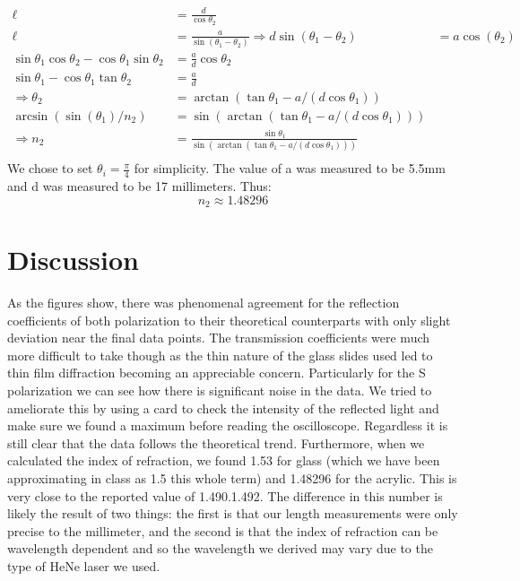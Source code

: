 \documentclass[letter, 11pt, onecolumn]{article}
\begin{document}
	\begin{align*}
		\ell &= \frac{d}{\cos\theta_2} \\ 
		\ell &= \frac{a}{\sin(\theta_1-\theta_2)}
		\Rightarrow d\sin(\theta_1-\theta_2) &= a\cos(\theta_2) \\ 
		\sin\theta_1\cos\theta_2-\cos\theta_1\sin\theta_2 &= \frac{a}{d}\cos\theta_2\\ 
		\sin\theta_1-\cos\theta_1\tan\theta_2 &= \frac{a}{d} \\ 
		\Rightarrow \theta_2 &= \arctan(\tan\theta_1-a/(d\cos\theta_1)) \\ 
		\arcsin(\sin(\theta_1)/n_2) &= \sin(\arctan(\tan\theta_1-a/(d\cos\theta_1))) \\ 
		\Rightarrow n_2 &= \frac{\sin\theta_1}{\sin(\arctan(\tan\theta_1-a/(d\cos\theta_1)))} \\ 
	\end{align*}
We chose to set $\theta_i = \frac{\pi}{4}$ for simplicity. The value of a was measured to be 5.5mm and d was measured to be 17 millimeters. Thus: 
	\begin{equation}
		n_2 \approx 1.48296 
	\end{equation}

\section*{Discussion} 
As the figures show, there was phenomenal agreement for the reflection coefficients of both polarization to their theoretical counterparts with only slight deviation near the final data points. The transmission coefficients were much more difficult to take though as the thin nature of the glass slides used led to thin film diffraction becoming an appreciable concern. Particularly for the S polarization we can see how there is significant noise in the data. We tried to ameliorate this by using a card to check the intensity of the reflected light and make sure we found a maximum before reading the oscilloscope. Regardless it is still clear that the data follows the theoretical trend. Furthermore, when we calculated the index of refraction, we found 1.53 for glass (which we have been approximating in class as 1.5 this whole term) and 1.48296 for the acrylic. This is very close to the reported value of 1.490.1.492. The difference in this number is likely the result of two things: the first is that our length measurements were only precise to the millimeter, and the second is that the index of refraction can be wavelength dependent and so the wavelength we derived may vary due to the type of HeNe laser we used. \\
\end{document}
